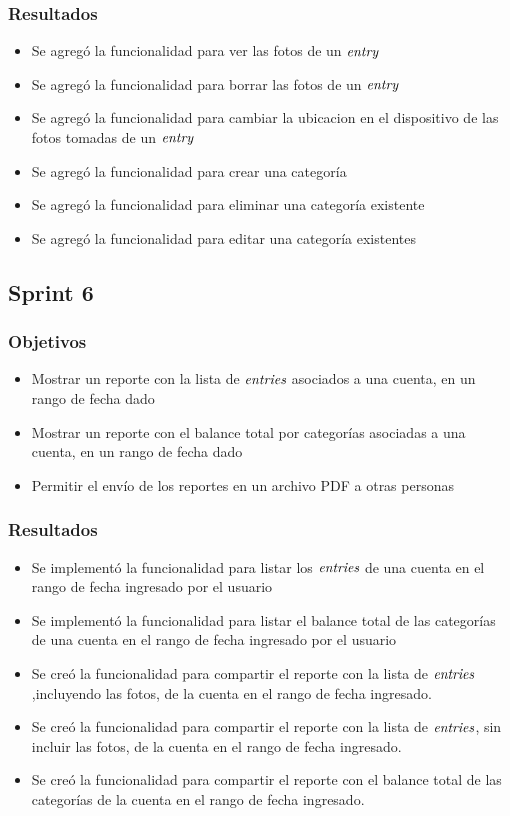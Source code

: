 \subsubsection{Resultados}
\begin{itemize}
\item Se agregó la funcionalidad para ver las fotos de un $\textit{entry}$
\item Se agregó la funcionalidad para borrar las fotos de un $\textit{entry}$
\item Se agregó la funcionalidad para cambiar la ubicacion en el dispositivo de las fotos tomadas de un $\textit{entry}$
\item Se agregó la funcionalidad para crear una categoría
\item Se agregó la funcionalidad para eliminar una categoría existente
\item Se agregó la funcionalidad para editar una categoría existentes
\end{itemize}



\subsection{Sprint 6}
\subsubsection{Objetivos}
\begin{itemize}
\item Mostrar un reporte con la lista de $\textit{entries}$ asociados a una cuenta, en un rango de fecha dado
\item Mostrar un reporte con el balance total por categorías asociadas a una cuenta, en un rango de fecha dado
\item Permitir el envío de los reportes en un archivo PDF a otras personas

\end{itemize}

\subsubsection{Resultados}
\begin{itemize}
\item Se implementó la funcionalidad para listar los $\textit{entries}$ de una cuenta en el rango de fecha ingresado por el usuario
\item Se implementó la funcionalidad para listar el balance total de las categorías de una cuenta en el rango de fecha ingresado por el usuario
\item Se creó la funcionalidad para compartir el reporte con la lista de $\textit{entries}$,incluyendo las fotos, de la cuenta en el rango de fecha ingresado.
\item Se creó la funcionalidad para compartir el reporte con la lista de $\textit{entries}$, sin incluir las fotos, de la cuenta en el rango de fecha ingresado.
\item Se creó la funcionalidad para compartir el reporte con el balance total de las categorías de la cuenta en el rango de fecha ingresado.
\end{itemize}

